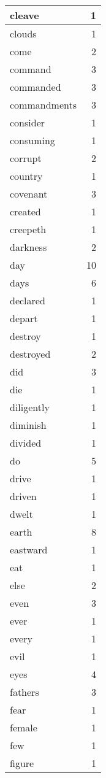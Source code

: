 \begin{center}
\begin{longtable}{l|r}
cleave & 1 \\ \hline
clouds & 1 \\ \hline
come & 2 \\ \hline
command & 3 \\ \hline
commanded & 3 \\ \hline
commandments & 3 \\ \hline
consider & 1 \\ \hline
consuming & 1 \\ \hline
corrupt & 2 \\ \hline
country & 1 \\ \hline
covenant & 3 \\ \hline
created & 1 \\ \hline
creepeth & 1 \\ \hline
darkness & 2 \\ \hline
day & 10 \\ \hline
days & 6 \\ \hline
declared & 1 \\ \hline
depart & 1 \\ \hline
destroy & 1 \\ \hline
destroyed & 2 \\ \hline
did & 3 \\ \hline
die & 1 \\ \hline
diligently & 1 \\ \hline
diminish & 1 \\ \hline
divided & 1 \\ \hline
do & 5 \\ \hline
drive & 1 \\ \hline
driven & 1 \\ \hline
dwelt & 1 \\ \hline
earth & 8 \\ \hline
eastward & 1 \\ \hline
eat & 1 \\ \hline
else & 2 \\ \hline
even & 3 \\ \hline
ever & 1 \\ \hline
every & 1 \\ \hline
evil & 1 \\ \hline
eyes & 4 \\ \hline
fathers & 3 \\ \hline
fear & 1 \\ \hline
female & 1 \\ \hline
few & 1 \\ \hline
figure & 1 \\ \hline

\end{longtable}
\end{center}
